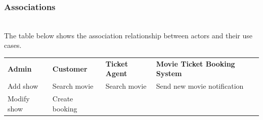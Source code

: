 \subsubsection{Associations}\label{1mMjTROkmlHgITsgjnqvo}
\\
The table below shows the association relationship between actors and their use cases.

\begin{center}
{\def\LTcaptype{none} %
\begin{longtable}[]{@{}
>{\raggedright\arraybackslash} p{}
>{\raggedright\arraybackslash} p{}
>{\raggedright\arraybackslash} p{}
>{\raggedright\arraybackslash} p{}@{}}
\toprule\noalign{}
\endhead
\bottomrule\noalign{}
\endlastfoot
\begin{minipage}[t]{\linewidth}\raggedright
\textbf{Admin}
\end{minipage} & \begin{minipage}[t]{\linewidth}\raggedright
\textbf{Customer}
\end{minipage} & \begin{minipage}[t]{\linewidth}\raggedright
\textbf{Ticket} \textbf{Agent}
\end{minipage} & \begin{minipage}[t]{\linewidth}\raggedright
\textbf{Movie Ticket Booking System}
\end{minipage} \\
\begin{minipage}[t]{\linewidth}\raggedright
Add show
\end{minipage} & \begin{minipage}[t]{\linewidth}\raggedright
Search movie
\end{minipage} & \begin{minipage}[t]{\linewidth}\raggedright
Search movie
\end{minipage} & \begin{minipage}[t]{\linewidth}\raggedright
Send new movie notification
\end{minipage} \\
\begin{minipage}[t]{\linewidth}\raggedright
Modify show
\end{minipage} & \begin{minipage}[t]{\linewidth}\raggedright
Create booking
\end{minipage} & \begin{minipage}[t]{\linewidth}\raggedright

\end{minipage}
\end{longtable}}
\end{center}
